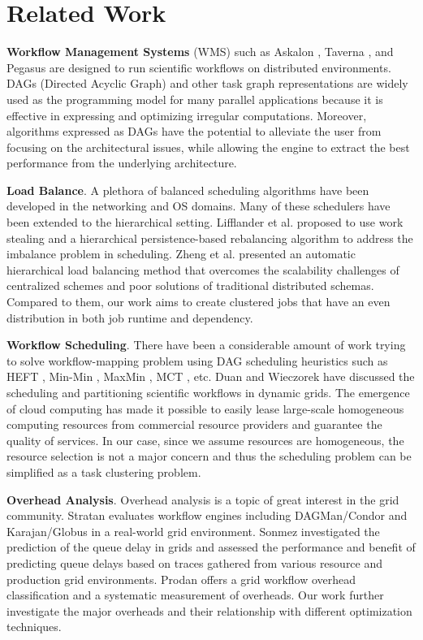 \chapter{Related Work}

\textbf{Workflow Management Systems} (WMS) such as Askalon \cite{Wieczorek2005}, Taverna \cite{Oinn2004}, and Pegasus \cite{Deelman2004} are designed to run scientific workflows on distributed environments. DAGs (Directed Acyclic Graph) and other task graph representations are widely used as the programming model for many parallel applications because it is effective in expressing and optimizing irregular computations. 
Moreover, algorithms expressed as DAGs have the potential to alleviate the user from focusing on the architectural issues, while allowing the engine to extract the best performance from the underlying architecture. 

\textbf{Load Balance}. A plethora of balanced scheduling algorithms have been developed in the networking and OS domains. Many of these schedulers have been extended to the hierarchical setting. Lifflander et al. \cite{Lifflander2012} proposed to use work stealing and a hierarchical persistence-based rebalancing algorithm to address the imbalance problem in scheduling. Zheng et al. \cite{Zheng2011} presented an automatic hierarchical load balancing method that overcomes the scalability challenges of centralized schemes and poor solutions of traditional distributed schemas. Compared to them, our work aims to create clustered jobs that have an even distribution in both job runtime and dependency. 

\textbf{Workflow Scheduling}. There have been a considerable amount of work trying to solve workflow-mapping problem using DAG scheduling heuristics such as HEFT \cite{Topcuoglu2002}, Min-Min \cite{Blythe2005}, MaxMin \cite{Braun2001}, MCT \cite{Braun2001}, etc. Duan \cite{Rubing2005} and Wieczorek \cite{Wieczorek2005} have discussed the scheduling and partitioning scientific workflows in dynamic grids. The emergence of cloud computing \cite{Armbrust2009} has made it possible to easily lease large-scale homogeneous computing resources from commercial resource providers and guarantee the quality of services. In our case, since we assume resources are homogeneous, the resource selection is not a major concern and thus the scheduling problem can be simplified as a task clustering problem. 

\textbf{Overhead Analysis}. Overhead analysis \cite{Prodan2008, Prodan2007} is a topic of great interest in the grid community. Stratan \cite{Stratan2008} evaluates workflow engines including DAGMan/Condor and Karajan/Globus in a real-world grid environment. Sonmez \cite{Sonmez2009} investigated the prediction of the queue delay in grids and assessed the performance and benefit of predicting queue delays based on traces gathered from various resource and production grid environments. Prodan \cite{Prodan2008} offers a grid workflow overhead classification and a systematic measurement of overheads. Our work further investigate the major overheads and their relationship with different optimization techniques. 



